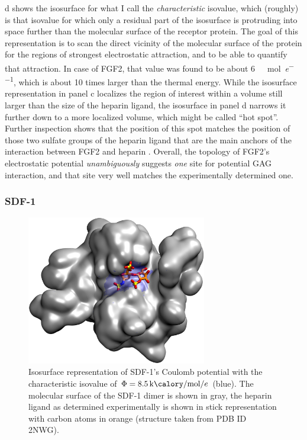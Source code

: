 d shows the isosurface for what I call the
\textit{characteristic} isovalue, which (roughly) is that isovalue for which
only a residual part of the isosurface is protruding into space further than the
molecular surface of the receptor protein. The goal of this representation is to
scan the direct vicinity of the molecular surface of the protein for the regions
of strongest electrostatic attraction, and to be able to quantify that
attraction. In case of FGF2, that value was found to be about
\SI{6}{\kilo\calory\per\mole\per\elementarycharge}, which is about 10 times
larger than the thermal energy. While the isosurface representation in panel c
localizes the region of interest within a volume still larger than the size of
the heparin ligand, the isosurface in panel d narrows it further down to a more
localized volume, which might be called \enquote{hot spot}. Further inspection
shows that the position of this spot matches the position of those two sulfate
groups of the heparin ligand that are the main anchors of the interaction
between FGF2 and heparin \cite{faham_heparin_1996}. Overall, the topology of
FGF2's electrostatic potential \textit{unambiguously} suggests
\textit{one} site for potential GAG interaction, and that site very well matches
the experimentally determined one.


\subsubsection{SDF-1}

\begin{figure}
\centering
\includegraphics[width=0.7\textwidth]{gfx/bspred/sdf1_isopot_8_5_view1_rotated_jcc_pub_001.jpg}
\caption[]{
Isosurface representation of SDF-1's Coulomb potential with the characteristic
isovalue of $\Phi=\SI{8.5}{\kilo\calory\per\mole\per\elementarycharge}$ (blue).
The molecular surface of the SDF-1 dimer is shown in gray, the heparin ligand as
determined experimentally is shown in stick representation with carbon atoms in
orange (structure taken from PDB ID 2NWG).}
\label{fig:bspred:sdf1_estatic}
\end{figure}

